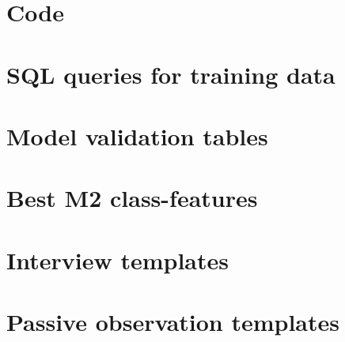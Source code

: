 \appendix

\chapter{Code} \label{python_code}

\chapter{SQL queries for training data} \label{sql_queries_for_trainingdata}


\chapter{Model validation tables} \label{model_validation_tables}

\chapter{Best M2 class-features} \label{M2_top_features}

\chapter{Interview templates} \label{interview_templates}

\chapter{Passive observation templates} \label{passive_obs_templates}

